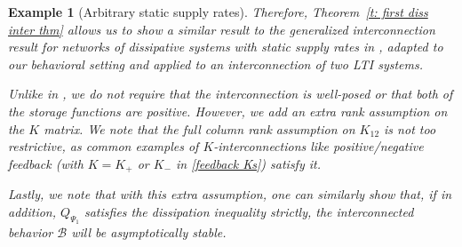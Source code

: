 \documentclass[letterpaper, 10 pt, conference]{ieeeconf}
\theoremstyle{ieeeconf}
\newtheorem{example}{Example}
\newcommand{\B}{\mathcal{B}}
\begin{document}
\begin{example}[Arbitrary static supply rates]
	Therefore, Theorem~\ref{t: first diss inter thm} allows us to show a similar result to the generalized interconnection result for networks of dissipative systems with static supply rates in \cite[Proposition~2.1]{arcak_stability_2016}, adapted to our behavioral setting and applied to an interconnection of two LTI systems. 
	
	Unlike in \cite[Proposition~2.1]{arcak_stability_2016}, we do not require that the interconnection is well-posed or that both of the storage functions are positive. However, we add an extra rank assumption on the $K$ matrix. We note that the full column rank assumption on $K_{12}$ is not too restrictive, as common examples of $K$-interconnections like positive/negative feedback (with $K=K_+$ or $K_-$ in \eqref{feedback Ks}) satisfy it.
	
	Lastly, we note that with this extra assumption, one can similarly show that, if in addition, $Q_{\Psi_1}$ satisfies the dissipation inequality strictly, the interconnected behavior $\B$ will be asymptotically stable.
	
	\label{ex arbitrary static sr}
\end{example}
\end{document}
